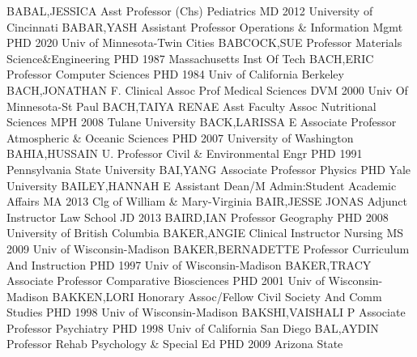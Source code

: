 \documentclass[
]{article}
\begin{document}
\textbar{}

BABAL,JESSICA \textbar{}  \textbar Asst Professor (Chs)
\textbar Pediatrics \textbar MD 2012 University of Cincinnati
\textbar BABAR,YASH \textbar{}  \textbar Assistant Professor
\textbar Operations \& Information Mgmt \textbar PHD 2020 Univ of
Minnesota-Twin Cities \textbar BABCOCK,SUE \textbar{} 
\textbar Professor \textbar Materials Science\&Engineering \textbar PHD
1987 Massachusetts Inst Of Tech \textbar BACH,ERIC \textbar{}
 \textbar Professor \textbar Computer Sciences \textbar PHD
1984 Univ of California Berkeley \textbar BACH,JONATHAN F. \textbar{}
 \textbar Clinical Assoc Prof \textbar Medical Sciences
\textbar DVM 2000 Univ Of Minnesota-St Paul \textbar BACH,TAIYA RENAE
\textbar{}  \textbar Asst Faculty Assoc \textbar Nutritional
Sciences \textbar MPH 2008 Tulane University \textbar BACK,LARISSA E
\textbar{}  \textbar Associate Professor \textbar Atmospheric
\& Oceanic Sciences \textbar PHD 2007 University of Washington
\textbar BAHIA,HUSSAIN U. \textbar{}  \textbar Professor
\textbar Civil \& Environmental Engr \textbar PHD 1991 Pennsylvania
State University \textbar BAI,YANG \textbar{} 
\textbar Associate Professor \textbar Physics \textbar PHD Yale
University \textbar BAILEY,HANNAH E \textbar{} 
\textbar Assistant Dean/M \textbar Admin:Student Academic Affairs
\textbar MA 2013 Clg of William \& Mary-Virginia \textbar BAIR,JESSE
JONAS \textbar{}  \textbar Adjunct Instructor \textbar Law
School \textbar JD 2013 \textbar BAIRD,IAN \textbar{} 
\textbar Professor \textbar Geography \textbar PHD 2008 University of
British Columbia \textbar BAKER,ANGIE \textbar{} 
\textbar Clinical Instructor \textbar Nursing \textbar MS 2009 Univ of
Wisconsin-Madison \textbar BAKER,BERNADETTE \textbar{} 
\textbar Professor \textbar Curriculum And Instruction \textbar PHD 1997
Univ of Wisconsin-Madison \textbar BAKER,TRACY \textbar{} 
\textbar Associate Professor \textbar Comparative Biosciences
\textbar PHD 2001 Univ of Wisconsin-Madison \textbar BAKKEN,LORI
\textbar{}  \textbar Honorary Assoc/Fellow \textbar Civil
Society And Comm Studies \textbar PHD 1998 Univ of Wisconsin-Madison
\textbar BAKSHI,VAISHALI P \textbar{}  \textbar Associate
Professor \textbar Psychiatry \textbar PHD 1998 Univ of California San
Diego \textbar BAL,AYDIN \textbar{}  \textbar Professor
\textbar Rehab Psychology \& Special Ed \textbar PHD 2009 Arizona State
\end{document}
